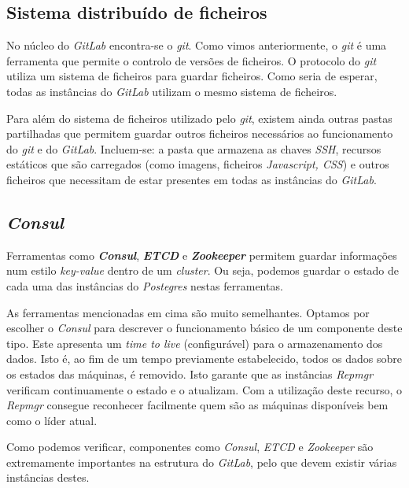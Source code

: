 \documentclass[12pt,a4paper]{article}
\begin{document}
\subsection{Sistema distribuído de ficheiros}
No núcleo do \emph{GitLab} encontra-se o \emph{git}. Como vimos anteriormente, o \emph{git} é uma ferramenta que permite o controlo de versões de ficheiros. O protocolo do \emph{git} utiliza um sistema de ficheiros para guardar ficheiros. Como seria de esperar, todas as instâncias do \emph{GitLab} utilizam o mesmo sistema de ficheiros.

Para além do sistema de ficheiros utilizado pelo \emph{git}, existem ainda outras pastas partilhadas que permitem guardar outros ficheiros necessários ao funcionamento do \emph{git} e do \emph{GitLab}. Incluem-se: a pasta que armazena as chaves \emph{SSH}, recursos estáticos que são carregados (como imagens, ficheiros \emph{Javascript, CSS}) e outros ficheiros que necessitam de estar presentes em todas as instâncias do \emph{GitLab}.

\subsection{\emph{Consul}}
Ferramentas como \textbf{\emph{Consul}}, \textbf{\emph{ETCD}} e \textbf{\emph{Zookeeper}} permitem guardar informações num estilo \emph{key-value} dentro de um \emph{cluster}. Ou seja, podemos guardar o estado de cada uma das instâncias do \emph{Postegres} nestas ferramentas. 

As ferramentas mencionadas em cima são muito semelhantes. Optamos por escolher o \emph{Consul} para descrever o funcionamento básico de um componente deste tipo. Este apresenta um \emph{time to live} (configurável) para o armazenamento dos dados. Isto é, ao fim de um tempo previamente estabelecido, todos os dados sobre os estados das máquinas, é removido. Isto garante que as instâncias \emph{Repmgr} verificam continuamente o estado e o atualizam. Com a utilização deste recurso, o \emph{Repmgr} consegue reconhecer facilmente quem são as máquinas disponíveis bem como o líder atual. 

Como podemos verificar, componentes como \emph{Consul}, \emph{ETCD} e \emph{Zookeeper} são extremamente importantes na estrutura do \emph{GitLab}, pelo que devem existir várias instâncias destes.
\end{document}
